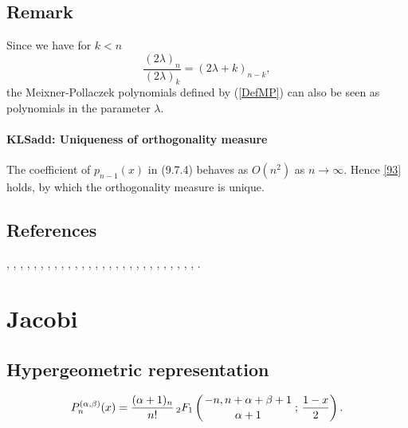 \documentclass[envcountchap,graybox]{svmono}
\newcommand{\hyp}[5]{\mbox{}_{#1}{F}_{#2}
\left(\genfrac{}{}{0pt}{}{#3}{#4}\,;\,#5\right)}
\newcommand\iy\infty
\newcommand{\hyp}[5]{\,\mbox{}_{#1}F_{#2}\!\left(
  \genfrac{}{}{0pt}{}{#3}{#4};#5\right)}
\begin{document}
\subsection*{Remark}
Since we have for $k<n$
$$\frac{(2\lambda)_n}{(2\lambda)_k}=(2\lambda+k)_{n-k},$$
the Meixner-Pollaczek polynomials defined by (\ref{DefMP}) can also be seen as polynomials
in the parameter $\lambda$.
%
\paragraph{\large\bf KLSadd: Uniqueness of orthogonality measure}The coefficient of $p_{n-1}(x)$ in (9.7.4) behaves as $O(n^2)$ as $n\to\iy$.
Hence \eqref{93} holds, by which the orthogonality measure is unique.
%
\subsection*{References}
\cite{AlSalam90}, \cite{AlSalamChihara76}, \cite{AndrewsAskey85}, \cite{Araaya2004},
\cite{Araaya2005}, \cite{Askey89I}, \cite{AskeyWilson85}, \cite{AtakRahmanSuslov},
\cite{AtakSuslov88}, \cite{CharrisIsmail}, \cite{ChenIsmail97}, \cite{Chihara78},
\cite{Ismail85II}, \cite{Ismail94}, \cite{Ismail2005II}, \cite{IsmailLi},
\cite{IsmailStanton97}, \cite{Koekoek2000}, \cite{Koorn88}, \cite{Koorn89II},
\cite{LabelleYehI}, \cite{LabelleYehII}, \cite{Lesky95II}, \cite{LiWong}, \cite{Meixner},
\cite{Nikiforov+}, \cite{Rahman78I}, \cite{Wilson80}, \cite{Wimp90}.


\section{Jacobi}

\par\setcounter{equation}{0}

\subsection*{Hypergeometric representation}
\begin{equation}
\label{DefJacobi}
P_n^{(\alpha,\beta)}(x)=\frac{(\alpha+1)_n}{n!}\,
\hyp{2}{1}{-n,n+\alpha+\beta+1}{\alpha+1}{\frac{1-x}{2}}.
\end{equation}
\end{document}
